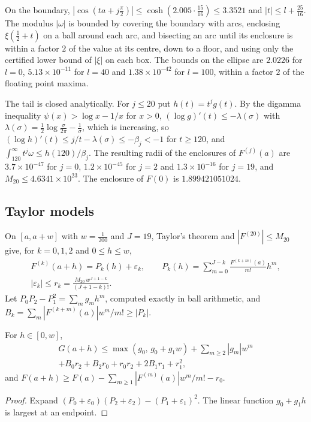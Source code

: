 On the boundary, $|\cos(ta+j\frac\pi2)|\le\cosh(2.005\cdot\frac{15}{16})\le3.3521$ and $|t|\le l+\frac{25}{16}$. The modulus $|\omega|$ is bounded by covering the boundary with arcs, enclosing $\xi(\frac12+t)$ on a ball around each arc, and bisecting an arc until its enclosure is within a factor $2$ of the value at its centre, down to a floor, and using only the certified lower bound of $|\xi|$ on each box. The bounds on the ellipse are $2.0226$ for $l=0$, $5.13\times10^{-11}$ for $l=40$ and $1.38\times10^{-42}$ for $l=100$, within a factor $2$ of the floating point maxima.

The tail is closed analytically. For $j\le20$ put $h(t)=t^jg(t)$. By the digamma inequality $\psi(x)>\log x-1/x$ for $x>0$, $(\log g)'(t)\le-\lambda(\sigma)$ with $\lambda(\sigma)=\frac12\log\frac\sigma{2\pi}-\frac1\sigma$, which is increasing, so $(\log h)'(t)\le j/t-\lambda(\sigma)\le-\beta_j<-1$ for $t\ge120$, and $\int_{120}^\infty t^j\omega\le h(120)/\beta_j$. The resulting radii of the enclosures of $F^{(j)}(a)$ are $3.7\times10^{-47}$ for $j=0$, $1.2\times10^{-45}$ for $j=2$ and $1.3\times10^{-16}$ for $j=19$, and $M_{20}\le4.6341\times10^{23}$. The enclosure of $F(0)$ is $1.899421051024$.

\subsection{Taylor models}

On $[a,a+w]$ with $w=\frac1{200}$ and $J=19$, Taylor's theorem and $|F^{(20)}|\le M_{20}$ give, for $k=0,1,2$ and $0\le h\le w$,
\begin{gather*}
F^{(k)}(a+h)=P_k(h)+\varepsilon_k,\qquad P_k(h)=\sum_{m=0}^{J-k}\frac{F^{(k+m)}(a)}{m!}h^m,\\
|\varepsilon_k|\le r_k=\frac{M_{20}\,w^{J+1-k}}{(J+1-k)!}.
\end{gather*}
Let $P_0P_2-P_1^2=\sum_mg_mh^m$, computed exactly in ball arithmetic, and $B_k=\sum_m|F^{(k+m)}(a)|w^m/m!\ge|P_k|$.

\begin{lemma}\label{p:lem:taylor}
For $h\in[0,w]$,
\begin{multline*}
G(a+h)\le\max(g_0,\,g_0+g_1w)+\sum_{m\ge2}|g_m|w^m\\+B_0r_2+B_2r_0+r_0r_2+2B_1r_1+r_1^2,
\end{multline*}
and $F(a+h)\ge F(a)-\sum_{m\ge1}|F^{(m)}(a)|w^m/m!-r_0$.
\end{lemma}

\begin{proof}
Expand $(P_0+\varepsilon_0)(P_2+\varepsilon_2)-(P_1+\varepsilon_1)^2$. The linear function $g_0+g_1h$ is largest at an endpoint.
\end{proof}

